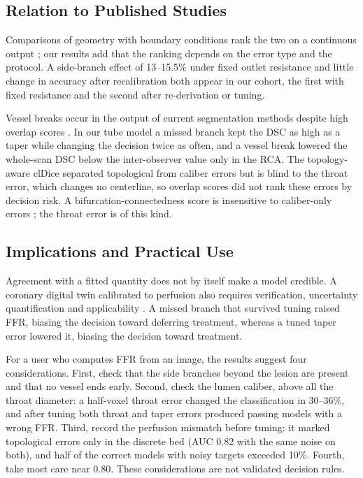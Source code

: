 \documentclass[journal,twoside,web]{ieeecolor}
\begin{document}
\subsection{Relation to Published Studies}
Comparisons of geometry with boundary conditions rank the two on a continuous output \cite{sankaran2016,tanade2022,korte2023};
our results add that the ranking depends on the error type and the protocol. A side-branch effect of 13--15.5\% under
fixed outlet resistance \cite{gamage2022} and little change in accuracy after recalibration \cite{gosling2020} both
appear in our cohort, the first with fixed resistance and the second after re-derivation or tuning.

Vessel breaks occur in the output of current segmentation methods despite high overlap scores \cite{bransby2026}.
In our tube model a missed branch kept the DSC as high as a taper while changing the decision twice as often, and a vessel break lowered the whole-scan DSC below the inter-observer value only in the RCA. The topology-aware clDice \cite{shit2021} separated topological from caliber errors but is blind to the throat error, which changes no centerline, so overlap scores did not rank these errors by decision risk. A bifurcation-connectedness score is insensitive to caliber-only errors \cite{owusu2026}; the throat error is of this kind.

\subsection{Implications and Practical Use}
Agreement with a fitted quantity does not by itself make a model credible. A coronary digital twin calibrated to perfusion also requires verification,
uncertainty quantification and applicability \cite{viceconti2025}. A missed branch that survived tuning raised FFR, biasing the decision toward
deferring treatment, whereas a tuned taper error lowered it, biasing the decision toward treatment.

For a user who computes FFR from an image, the results suggest four considerations. First, check that the side branches beyond the lesion are present and that no vessel ends early.
Second, check the lumen caliber, above all the throat diameter: a half-voxel throat error changed the classification in 30--36\%, and after tuning both throat and taper errors produced passing models with a wrong FFR. Third, record the perfusion mismatch before tuning: it marked topological errors only in the discrete bed (AUC 0.82 with the same noise on both), and half of the correct models with noisy targets exceeded 10\%. Fourth, take most care near 0.80. These considerations are not validated decision rules.
\end{document}
